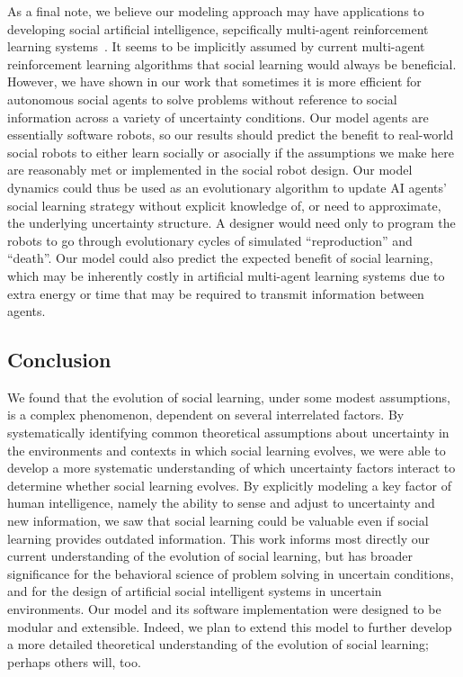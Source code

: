 \documentclass[letterpaper,11.5pt]{scrartcl}
\begin{document}
As a final note, we believe 
our modeling approach may have applications to developing social artificial
intelligence, sepcifically multi-agent reinforcement learning
systems~\cite{Sandholm1996,Ndousse2021,Gronauer2022,Jaques2019}.
It seems to be implicitly assumed by current multi-agent reinforcement learning
algorithms that social learning
would always be beneficial. However, we have shown in our work that sometimes 
it is more efficient for autonomous social agents to solve problems without
reference to social information across a variety of uncertainty conditions. 
Our model agents are essentially software
robots, so our results should predict the benefit to real-world social robots
to either learn socially or asocially if the assumptions we make here are 
reasonably met or implemented in the social robot design.
Our model dynamics could thus be used as an
evolutionary algorithm to update AI agents' social learning strategy without
explicit knowledge of, or need to approximate, the underlying uncertainty structure.
A designer would need only to program the robots to go through evolutionary
cycles of simulated ``reproduction'' and ``death''.
Our model could also predict the expected benefit of social learning, which may be
inherently costly in artificial multi-agent learning systems due to extra
energy or time that may be required to transmit information between agents.


\subsection{Conclusion}

We found that the evolution of social learning, under some modest
assumptions, is a complex phenomenon, dependent on several interrelated factors. By systematically
identifying common theoretical assumptions about uncertainty in the environments and contexts
in which social learning evolves, we were able to develop a more systematic understanding of
which uncertainty factors interact to determine whether social learning evolves. By
explicitly modeling a key factor of human intelligence, namely the ability to sense and
adjust to uncertainty and new information, we saw that social learning could be
valuable even if social learning provides outdated information. This work
informs most directly our current understanding of the evolution of social learning, but has
broader significance for the behavioral science of problem solving in uncertain conditions, and
for the design of artificial social intelligent systems in uncertain environments.  Our model
and its software implementation were designed to be modular and extensible.  Indeed,
we plan to extend this model to further develop a more detailed theoretical understanding of
the evolution of social learning; perhaps others will, too.
\end{document}
